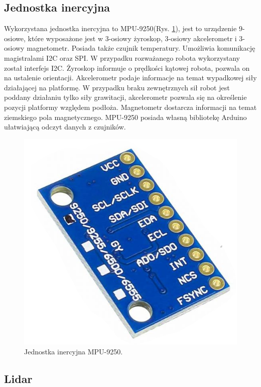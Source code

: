 \subsection{Jednostka inercyjna}

Wykorzystana jednostka inercyjna to MPU-9250(Rys. \ref{fig:imu}), jest to urządzenie 9-osiowe, które wyposażone jest w 3-osiowy żyroskop, 3-osiowy akcelerometr i 3-osiowy magnetometr. Posiada także czujnik temperatury.  Umożliwia komunikację magistralami I2C oraz SPI. W przypadku rozważanego robota wykorzystany został interfejs I2C. Żyroskop informuje o prędkości kątowej robota, pozwala on na ustalenie orientacji. Akcelerometr podaje informacje na temat wypadkowej siły działającej na platformę. W przypadku braku zewnętrznych sił robot jest poddany działaniu tylko siły grawitacji, akcelerometr pozwala się na określenie pozycji platformy względem podłoża. Magnetometr dostarcza informacji na temat ziemskiego pola magnetycznego. MPU-9250 posiada własną bibliotekę Arduino ułatwiającą odczyt danych z czujników.

\begin{figure}[h]
	\centering
	\includegraphics[scale=0.4]{imu.png}
	\caption{Jednostka inercyjna MPU-9250.}
	\label{fig:imu}
\end{figure}

\subsection{Lidar}

